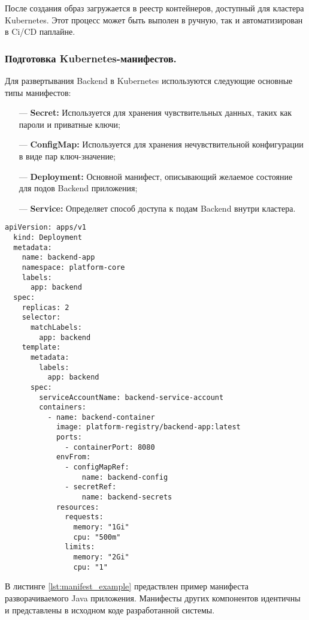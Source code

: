 После создания образ загружается в реестр контейнеров, доступный для кластера Kubernetes. Этот процесс может быть выполен в ручную, так и автоматизирован в Ci/CD паплайне.

\subsubsection{Подготовка Kubernetes-манифестов.}

Для развертывания Backend в Kubernetes используются следующие основные типы манифестов:

\begin{itemize}
    \item[---]\textbf{Secret:} Используется для хранения чувствительных данных, таких как пароли и приватные ключи;
    \item[---]\textbf{ConfigMap:} Используется для хранения нечувствительной конфигурации в виде пар ключ-значение;
    \item[---]\textbf{Deployment:} Основной манифест, описывающий желаемое состояние для подов Backend приложения;
    \item[---]\textbf{Service:} Определяет способ доступа к подам Backend внутри кластера.
\end{itemize}

\begin{lstlisting}[caption={Манифест Deployment компонета}, label=lst:manifest_example]
  apiVersion: apps/v1
  kind: Deployment
  metadata:
    name: backend-app          
    namespace: platform-core   
    labels:
      app: backend             
  spec:
    replicas: 2                
    selector:
      matchLabels:
        app: backend           
    template:
      metadata:
        labels:
          app: backend         
      spec:
        serviceAccountName: backend-service-account 
        containers:
          - name: backend-container 
            image: platform-registry/backend-app:latest 
            ports:
              - containerPort: 8080 
            envFrom:
              - configMapRef:
                  name: backend-config 
              - secretRef:
                  name: backend-secrets 
            resources:
              requests: 
                memory: "1Gi"
                cpu: "500m" 
              limits:   
                memory: "2Gi"
                cpu: "1"    
\end{lstlisting}

В листинге \ref{lst:manifest_example} предаствлен пример манифеста разворачиваемого Java приложения. Манифесты других компонентов идентичны и представлены в исходном коде разработанной системы.

